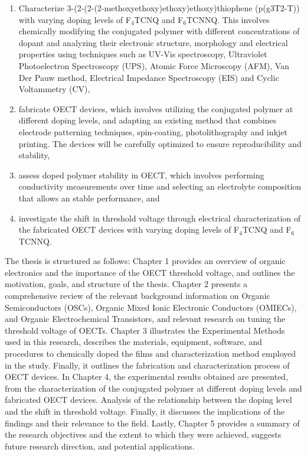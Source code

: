\begin{enumerate}
\item Characterize 3-(2-(2-(2-methoxyethoxy)ethoxy)ethoxy)thiophene (p(g3T2-T)) with varying doping levels of F$_{4}$TCNQ and F$_{6}$TCNNQ. This involves chemically modifying the conjugated polymer with different concentrations of dopant and analyzing their electronic structure, morphology and electrical properties using techniques such as UV-Vis spectroscopy, Ultraviolet Photoelectron Spectroscopy (UPS), Atomic Force Microscopy (AFM), Van Der Pauw method, Electrical Impedance Spectroscopy (EIS) and Cyclic Voltammetry (CV),

\item fabricate OECT devices, which involves utilizing the conjugated polymer at different doping levels, and adapting an existing method that combines electrode patterning techniques, spin-coating, photolithography and inkjet printing. The devices will be carefully optimized to ensure reproducibility and stability,
 
\item assess doped polymer stability in OECT, which involves performing conductivity measurements over time and selecting an electrolyte composition that allows an stable performance, and
 
\item investigate the shift in threshold voltage through electrical characterization of the fabricated OECT devices with varying doping levels of F$_{4}$TCNQ and F$_{6}$TCNNQ.


\end{enumerate}

The thesis is structured as follows: Chapter 1 provides an overview of organic electronics and the importance of the OECT threshold voltage, and outlines the motivation, goals, and structure of the thesis. Chapter 2 presents a comprehensive review of the relevant background information on Organic Semiconductors (OSCs), Organic Mixed Ionic Electronic Conductors (OMIECs), and Organic Electrochemical Transistors, and relevant research on tuning the threshold voltage of OECTs. Chapter 3 illustrates the Experimental Methods used in this research, describes the materials, equipment, software, and procedures to chemically doped the films and characterization method employed in the study. Finally, it outlines the fabrication and characterization process of OECT devices. In Chapter 4, the experimental results obtained are presented, from the characterization of the conjugated polymer at different doping levels and fabricated OECT devices. Analysis of the relationship between the doping level and the shift in threshold voltage. Finally, it discusses the implications of the findings and their relevance to the field. Lastly, Chapter 5 provides a summary of the research objectives and the extent to which they were achieved, suggests future research direction, and potential applications.


